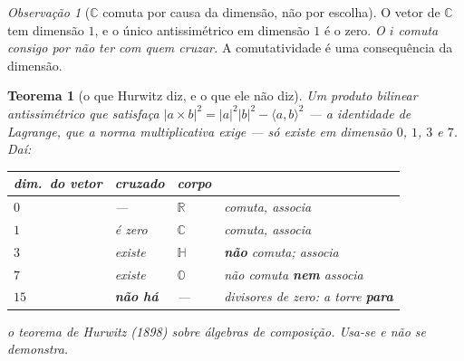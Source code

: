 \documentclass[11pt]{article}
\providecommand{\Oo}{\mathbb O}
\newcommand{\R}{\mathbb R}
\newcommand{\C}{\mathbb C}
\newcommand{\Hq}{\mathbb H}
\theoremstyle{plain}
\newtheorem{teorema}{Teorema}
\theoremstyle{remark}
\newtheorem{obs}{Observação}
\providecommand{\citado}[1]{\emph{#1}}
\begin{document}
\begin{obs}[$\C$ comuta por causa da dimensão, não por escolha]
O vetor de $\C$ tem dimensão $1$, e o único antissimétrico em dimensão $1$ é o zero. \emph{O $i$
comuta consigo por não ter com quem cruzar.} A comutatividade é uma consequência da dimensão.
\end{obs}

\begin{teorema}[o que Hurwitz diz, e o que ele não diz]
Um produto bilinear antissimétrico que satisfaça $|a\times b|^2=|a|^2|b|^2-\langle a,b\rangle^2$
--- a identidade de Lagrange, que a \emph{norma multiplicativa} exige --- só existe em dimensão
$0$, $1$, $3$ e $7$. Daí:
\begin{center}
\begin{tabular}{llll}
\toprule
dim.\ do vetor & cruzado & corpo & \\
\midrule
$0$ & --- & $\R$ & comuta, associa \\
$1$ & é \emph{zero} & $\C$ & comuta, associa \\
$3$ & existe & $\Hq$ & \textbf{não} comuta; associa \\
$7$ & existe & $\Oo$ & não comuta \textbf{nem} associa \\
$15$ & \textbf{não há} & --- & divisores de zero: a torre \textbf{para} \\
\bottomrule
\end{tabular}
\end{center}
\end{teorema}
\citado{o teorema de Hurwitz (1898) sobre álgebras de composição. Usa-se e não se demonstra.}
\end{document}
